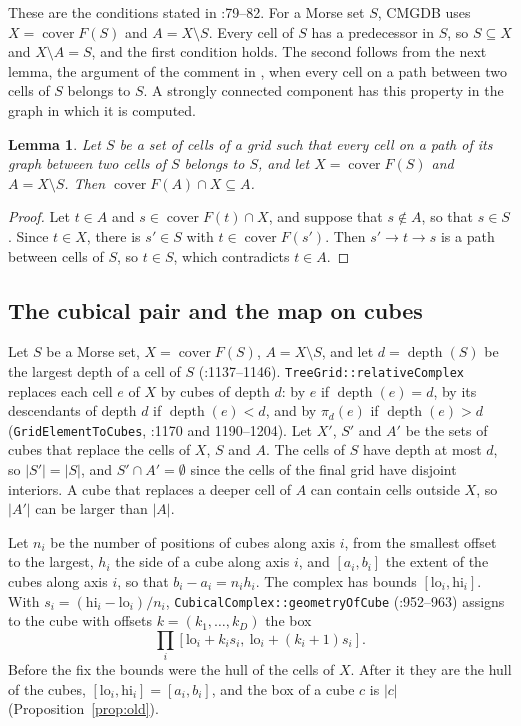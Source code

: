 \documentclass[11pt]{article}
\theoremstyle{plain}
\newtheorem{lemma}[proposition]{Lemma}
\theoremstyle{definition}
\theoremstyle{remark}
\DeclareMathOperator{\cover}{cover}
\DeclareMathOperator{\depth}{depth}
\newcommand{\lo}{\mathrm{lo}}
\newcommand{\hi}{\mathrm{hi}}
\newcommand{\code}[1]{\texttt{#1}}
\begin{document}
These are the conditions stated in :79--82. For a Morse set $S$, CMGDB uses $X=\cover F(S)$ and $A=X\setminus S$. Every cell of $S$ has a predecessor in $S$, so $S\subseteq X$ and $X\setminus A=S$, and the first condition holds. The second follows from the next lemma, the argument of the comment in , when every cell on a path between two cells of $S$ belongs to $S$. A strongly connected component has this property in the graph in which it is computed.

\begin{lemma}\label{lem:pair}
Let $S$ be a set of cells of a grid such that every cell on a path of its graph between two cells of $S$ belongs to $S$, and let $X=\cover F(S)$ and $A=X\setminus S$. Then $\cover F(A)\cap X\subseteq A$.
\end{lemma}

\begin{proof}
Let $t\in A$ and $s\in\cover F(t)\cap X$, and suppose that $s\notin A$, so that $s\in S$. Since $t\in X$, there is $s'\in S$ with $t\in\cover F(s')$. Then $s'\to t\to s$ is a path between cells of $S$, so $t\in S$, which contradicts $t\in A$.
\end{proof}

\subsection{The cubical pair and the map on cubes}\label{sec:cubes}

Let $S$ be a Morse set, $X=\cover F(S)$, $A=X\setminus S$, and let $d=\depth(S)$ be the largest depth of a cell of $S$ (:1137--1146). \code{TreeGrid::relativeComplex} replaces each cell $e$ of $X$ by cubes of depth $d$: by $e$ if $\depth(e)=d$, by its descendants of depth $d$ if $\depth(e)<d$, and by $\pi_d(e)$ if $\depth(e)>d$ (\code{GridElementToCubes}, :1170 and 1190--1204). Let $X'$, $S'$ and $A'$ be the sets of cubes that replace the cells of $X$, $S$ and $A$. The cells of $S$ have depth at most $d$, so $|S'|=|S|$, and $S'\cap A'=\emptyset$ since the cells of the final grid have disjoint interiors. A cube that replaces a deeper cell of $A$ can contain cells outside $X$, so $|A'|$ can be larger than $|A|$.

Let $n_i$ be the number of positions of cubes along axis $i$, from the smallest offset to the largest, $h_i$ the side of a cube along axis $i$, and $[a_i,b_i]$ the extent of the cubes along axis $i$, so that $b_i-a_i=n_ih_i$. The complex has bounds $[\lo_i,\hi_i]$. With $s_i=(\hi_i-\lo_i)/n_i$, \code{CubicalComplex::geometryOfCube} (:952--963) assigns to the cube with offsets $k=(k_1,\dots,k_D)$ the box
\[
\prod_i\left[\lo_i+k_is_i,\ \lo_i+(k_i+1)s_i\right].
\]
Before the fix the bounds were the hull of the cells of $X$. After it they are the hull of the cubes, $[\lo_i,\hi_i]=[a_i,b_i]$, and the box of a cube $c$ is $|c|$ (Proposition~\ref{prop:old}).
\end{document}
